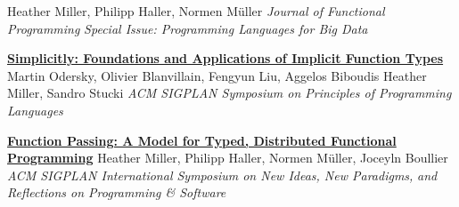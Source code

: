 \documentclass[9pt]{article}
\begin{document}
\pagebreak



\newline\noindent Heather Miller, Philipp Haller, Normen M\"{u}ller
\newline\noindent\emph{Journal of Functional Programming}
\newline\noindent\emph{Special Issue: Programming Languages for Big Data}
\bigskip




\noindent\href{https://infoscience.epfl.ch/record/229878}{\bf Simplicitly: Foundations and Applications of Implicit Function Types}
\newline\noindent Martin Odersky, Olivier Blanvillain, Fengyun Liu, Aggelos Biboudis
\newline\noindent Heather Miller, Sandro Stucki
\newline\noindent\emph{ACM SIGPLAN Symposium on Principles of Programming Languages}
\bigskip

\noindent\href{https://infoscience.epfl.ch/record/205822}{\bf Function Passing: A Model for Typed, Distributed Functional}\vspace{-0.03in}
\newline\noindent\href{https://infoscience.epfl.ch/record/205822}{\bf Programming}
\newline\noindent Heather Miller, Philipp Haller, Normen M\"{u}ller, Joceyln Boullier
\newline\noindent\emph{ACM SIGPLAN International Symposium on New Ideas, New Paradigms,}
\newline\noindent\emph{and Reflections on Programming \& Software}
\bigskip
\end{document}
